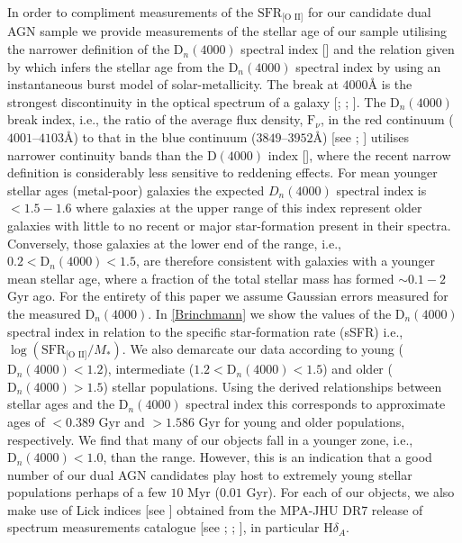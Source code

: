 In order to compliment measurements of the $\text{SFR}_{\text{[O II]}}$ for our candidate dual AGN sample we provide measurements of the stellar age of our sample utilising the narrower definition of the $\text{D}_{n}(4000)$ spectral index [\cite{1999ApJ...527...54B}] and the relation given by \cite{Kauffmann_2003} which infers the stellar age from the $\text{D}_{n}(4000)$ spectral index by using an instantaneous burst model of solar-metallicity. The break at $4000$Å is the strongest discontinuity in the optical spectrum of a galaxy [\cite{Bruzual_A__1983}; \cite{1999ApJ...527...54B}; \cite{Kauffmann_2003}]. The $\text{D}_{n}(4000)$ break index, i.e., the ratio of the average flux density, $\text{F}_{\nu}$, in the red continuum ($4001$--$4103$Å) to that in the blue continuum ($3849$--$3952$Å) [see \cite{1999ApJ...527...54B}; \cite{Kauffmann_2003}] utilises narrower continuity bands than the $\text{D}(4000)$ index [\cite{Bruzual_A__1983}], where the recent narrow definition is considerably less sensitive to reddening effects. For mean younger stellar ages (metal-poor) galaxies the expected $D_{n}(4000)$ spectral index is $<{1.5-1.6}$ where galaxies at the upper range of this index represent older galaxies with little to no recent or major star-formation present in their spectra. Conversely, those galaxies at the lower end of the range, i.e., ${0.2}<{\text{D}_{n}(4000)}<{1.5}$, are therefore consistent with galaxies with a younger mean stellar age, where a fraction of the total stellar mass has formed $\sim{0.1-2}$ $\text{Gyr}$ ago. For the entirety of this paper we assume Gaussian errors measured for the measured $\text{D}_{n}(4000)$. In \ref{Brinchmann} we show the values of the $\text{D}_{n}(4000)$ spectral index in relation to the specific star-formation rate (sSFR) i.e., $\log{(\text{SFR}_{\text{[O II]}}/M_{*})}$. We also demarcate our data according to young ($\text{D}_{n}(4000)<{1.2}$), intermediate (${1.2}<{\text{D}_{n}(4000)}<{1.5}$) and older ($\text{D}_{n}(4000)>{1.5}$) stellar populations. Using the derived relationships between stellar ages and the $\text{D}_{n}(4000)$ spectral index this corresponds to approximate ages of $<0.389$ Gyr and $>{1.586}$ Gyr for young and older populations, respectively. We find that many of our objects fall in a younger zone, i.e., $\text{D}_{n}(4000)<{1.0}$, than the \cite{Kauffmann_2003} range. However, this is an indication that a good number of our dual AGN candidates play host to extremely young stellar populations perhaps of a few $10$ Myr ($0.01$ Gyr). For each of our objects, we also make use of Lick indices [see \cite{Worthey_1997}] obtained from the MPA-JHU DR7 release of spectrum measurements catalogue [see \cite{Kauffmann_2003}; \cite{Brinchmann_2004}; \cite{Salim_2007}], in particular $\text{H}\delta_{A}$.

